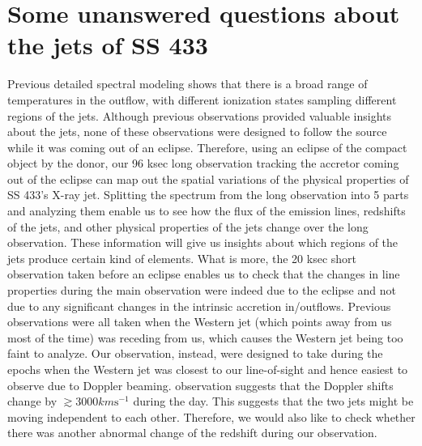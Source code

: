 \section{Some unanswered questions about the jets of SS 433}
Previous detailed spectral modeling shows that there is a broad range of temperatures in the outflow, with different ionization states sampling different regions of the jets. Although previous observations provided valuable insights about the jets, none of these observations were designed to follow the source while it was coming out of an eclipse. Therefore, using an eclipse of the compact object by the donor, our 96 ksec long observation tracking the accretor coming out of the eclipse can map out the spatial variations of the physical properties of SS 433’s X-ray jet. Splitting the spectrum from the long observation into 5 parts and analyzing them enable us to see how the flux of the emission lines, redshifts of the jets, and other physical properties of the jets change over the long observation. These information will give us insights about which regions of the jets produce certain kind of elements. What is more, the 20 ksec short observation taken before an eclipse enables us to check that the changes in line properties during the main observation were indeed due to the eclipse and not due to any significant changes in the intrinsic accretion in/outflows. Previous observations were all taken when the Western jet (which points away from us most of the time) was receding from us, which causes the Western jet being too faint to analyze. Our observation, instead, were designed to take during the epochs when the Western jet was closest to our line-of-sight and hence easiest to observe due to Doppler beaming. \cite{Marshall2013} observation suggests that the Doppler shifts change by $\gtrsim 3000 km \mathrm{s^{-1}}$ during the day. This suggests that the two jets might be moving independent to each other. Therefore, we would also like to check whether there was another abnormal change of the redshift during our observation. \par 








